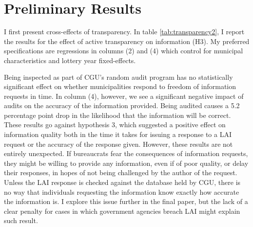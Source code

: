 \documentclass[11pt]{article}
\begin{document}
\section{Preliminary Results} \label{sec:results_paper3}

I first present cross-effects of transparency. In table \ref{tab:transparency2}, I report the results for the effect of active transparency on information (H3). My preferred specifications are regressions in columns (2) and (4) which control for municipal characteristics and lottery year fixed-effects.



Being inspected as part of CGU's random audit program has no statistically significant effect on whether municipalities respond to freedom of information requests in time. In column (4), however, we see a significant negative impact of audits on the accuracy of the information provided. Being audited causes a 5.2 percentage point drop in the likelihood that the information will be correct. These results go against hypothesis 3, which suggested a positive effect on information quality both in the time it takes for issuing a response to a LAI request or the accuracy of the response given. However, these results are not entirely unexpected. If bureaucrats fear the consequences of information requests, they might be willing to provide any information, even if of poor quality, or delay their responses, in hopes of not being challenged by the author of the request. Unless the LAI response is checked against the database held by CGU, there is no way that individuals requesting the information know exactly how accurate the information is. I explore this issue further in the final paper, but the lack of a clear penalty for cases in which government agencies breach LAI might explain such result.


\end{document}
